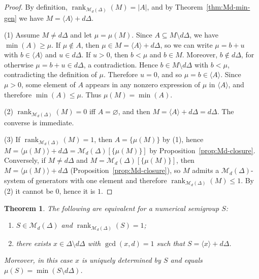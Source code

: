 \documentclass[12pt,a4paper]{amsart}
\newtheorem{theorem}{Theorem}[section]
\theoremstyle{definition}
\theoremstyle{remark}
\begin{document}
\begin{proof}
By definition, $\operatorname{rank}_{\mathcal{M}_d(\Delta)}(M)=|A|$, and by Theorem~\ref{thm:Md-min-gen} we have $M=\langle A\rangle+d\Delta$.

(1) Assume $M\neq d\Delta$ and let $\mu=\mu(M)$. Since $A\subseteq M\setminus d\Delta$, we have
$\min(A)\ge \mu$. If $\mu\notin A$, then $\mu\in M=\langle A\rangle+d\Delta$, so we can write
$\mu=b+u$ with $b\in\langle A\rangle$ and $u\in d\Delta$. If $u>0$, then $b<\mu$ and
$b\in M$. Moreover, $b\notin d\Delta$, for otherwise $\mu=b+u\in d\Delta$, a contradiction.
Hence $b\in M\setminus d\Delta$ with $b<\mu$, contradicting the definition of $\mu$.
Therefore $u=0$, and so $\mu=b\in\langle A\rangle$. Since $\mu>0$, some element of $A$
appears in any nonzero expression of $\mu$ in $\langle A\rangle$, and therefore
$\min(A)\le\mu$. Thus $\mu(M)=\min(A)$.

(2) $\operatorname{rank}_{\mathcal{M}_d(\Delta)}(M)=0$ iff $A=\varnothing$, and then $M=\langle A\rangle+d\Delta=d\Delta$. The converse is immediate.

(3) If $\operatorname{rank}_{\mathcal{M}_d(\Delta)}(M)=1$, then $A=\{\mu(M)\}$ by (1), hence
$M=\langle\mu(M)\rangle+d\Delta=\mathcal{M}_d(\Delta)[\{\mu(M)\}]$ by Proposition~\ref{prop:Md-closure}.
Conversely, if $M\neq d\Delta$ and $M=\mathcal{M}_d(\Delta)[\{\mu(M)\}]$, then $M=\langle\mu(M)\rangle+d\Delta$ (Proposition~\ref{prop:Md-closure}),
so $M$ admits a $\mathcal{M}_d(\Delta)$-system of generators with one element and therefore $\operatorname{rank}_{\mathcal{M}_d(\Delta)}(M)\le 1$.
By (2) it cannot be $0$, hence it is $1$.
\end{proof}

\begin{theorem}\label{th:rankone-char}
The following are equivalent for a numerical semigroup $S$:
\begin{enumerate}
\item $S\in\mathcal{M}_d(\Delta)$ and $\operatorname{rank}_{\mathcal{M}_d(\Delta)}(S)=1$;
\item there exists $x\in\Delta\setminus d\Delta$ with $\gcd(x,d)=1$ such that $S=\langle x\rangle+d\Delta$.
\end{enumerate}
Moreover, in this case $x$ is uniquely determined by $S$ and equals $\mu(S)=\min(S\setminus d\Delta)$.
\end{theorem}
\end{document}
